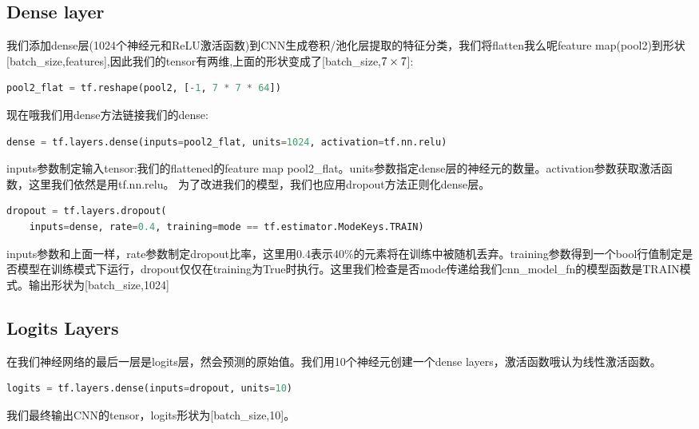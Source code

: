 \subsection{Dense layer}
我们添加dense层(1024个神经元和ReLU激活函数)到CNN生成卷积/池化层提取的特征分类，我们将flatten我么呢feature map(pool2)到形状[batch\_size,features],因此我们的tensor有两维,上面的形状变成了[batch\_size,$7\times7\time64$]:
\begin{lstlisting}[language=Python]
pool2_flat = tf.reshape(pool2, [-1, 7 * 7 * 64])
\end{lstlisting}
现在哦我们用dense方法链接我们的dense:
\begin{lstlisting}[language=Python]
dense = tf.layers.dense(inputs=pool2_flat, units=1024, activation=tf.nn.relu)
\end{lstlisting}
inputs参数制定输入tensor:我们的flattened的feature map pool2\_flat。units参数指定dense层的神经元的数量。activation参数获取激活函数，这里我们依然是用tf.nn.relu。
为了改进我们的模型，我们也应用dropout方法正则化dense层。
\begin{lstlisting}[language=Python]
dropout = tf.layers.dropout(
    inputs=dense, rate=0.4, training=mode == tf.estimator.ModeKeys.TRAIN)
\end{lstlisting}
inputs参数和上面一样，rate参数制定dropout比率，这里用0.4表示40\%的元素将在训练中被随机丢弃。training参数得到一个bool行值制定是否模型在训练模式下运行，dropout仅仅在training为True时执行。这里我们检查是否mode传递给我们cnn\_model\_fn的模型函数是TRAIN模式。输出形状为[batch\_size,1024]
\subsection{Logits Layers}
在我们神经网络的最后一层是logits层，然会预测的原始值。我们用10个神经元创建一个dense layers，激活函数哦认为线性激活函数。
\begin{lstlisting}[language=Python]
logits = tf.layers.dense(inputs=dropout, units=10)
\end{lstlisting}
我们最终输出CNN的tensor，logits形状为[batch\_size,10]。
